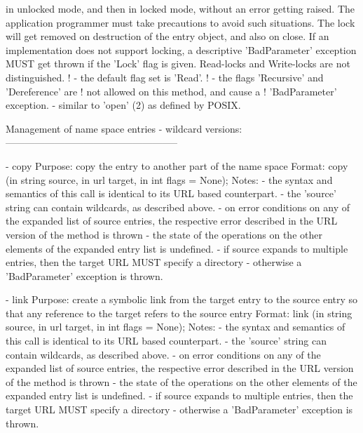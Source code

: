 \begin{myspec}
                  in unlocked mode, and then in locked mode,
                  without an error getting raised.  The
                  application programmer must take precautions
                  to avoid such situations.  The lock will get
                  removed on destruction of the entry object, and
                  also on close.  If an implementation does not
                  support locking, a descriptive 'BadParameter'
                  exception MUST get thrown if the 'Lock' flag 
                  is given.  Read-locks and Write-locks are not
                  distinguished.
!               - the default flag set is 'Read'.
!               - the flags 'Recursive' and 'Dereference' are 
!                 not allowed on this method, and cause a 
!                 'BadParameter' exception.
                - similar to 'open' (2) as defined by POSIX.
 
 
    Management of name space entries - wildcard versions:
    -----------------------------------------------------
 
    - copy
      Purpose:  copy the entry to another part of the name space
      Format:   copy               (in  string     source,
                                    in  url        target,
                                    in  int        flags = None);
      Notes:    - the syntax and semantics of this call is 
                  identical to its URL based counterpart.  
                - the 'source' string can contain wildcards, as
                  described above.
                - on error conditions on any of the expanded 
                  list of source entries, the respective error 
                  described in the URL version of the method is 
                  thrown - the state of the operations on the 
                  other elements of the expanded entry list is 
                  undefined.
                - if source expands to multiple entries, then the
                  target URL MUST specify a directory -
                  otherwise a 'BadParameter' exception is thrown.
 
 
    - link
      Purpose:  create a symbolic link from the target entry to
                the source entry so that any reference to the
                target refers to the source entry
      Format:   link               (in  string     source,
                                    in  url        target,
                                    in  int        flags = None);
      Notes:    - the syntax and semantics of this call is 
                  identical to its URL based counterpart.  
                - the 'source' string can contain wildcards, as
                  described above.
                - on error conditions on any of the expanded 
                  list of source entries, the respective error 
                  described in the URL version of the method is 
                  thrown - the state of the operations on the 
                  other elements of the expanded entry list is 
                  undefined.
                - if source expands to multiple entries, then the
                  target URL MUST specify a directory -
                  otherwise a 'BadParameter' exception is thrown.
 

\end{myspec}
